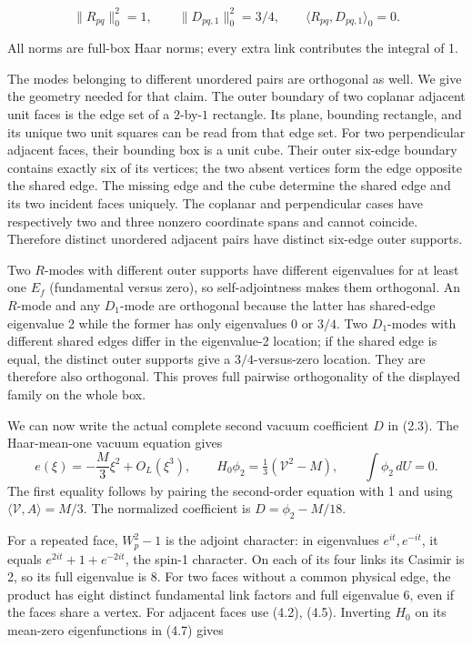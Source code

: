 \documentclass[
  11pt,
]{article}
\begin{document}
\[
\|R_{pq}\|_0^2=1,\qquad
\|D_{pq,1}\|_0^2=3/4,\qquad
\langle R_{pq},D_{pq,1}\rangle_0=0.
\tag{4.6}
\]

All norms are full-box Haar norms; every extra link contributes the
integral of 1.

The modes belonging to different unordered pairs are orthogonal as well.
We give the geometry needed for that claim. The outer boundary of two
coplanar adjacent unit faces is the edge set of a \(2\)-by-\(1\)
rectangle. Its plane, bounding rectangle, and its unique two unit
squares can be read from that edge set. For two perpendicular adjacent
faces, their bounding box is a unit cube. Their outer six-edge boundary
contains exactly six of its vertices; the two absent vertices form the
edge opposite the shared edge. The missing edge and the cube determine
the shared edge and its two incident faces uniquely. The coplanar and
perpendicular cases have respectively two and three nonzero coordinate
spans and cannot coincide. Therefore distinct unordered adjacent pairs
have distinct six-edge outer supports.

Two \(R\)-modes with different outer supports have different eigenvalues
for at least one \(E_f\) (fundamental versus zero), so self-adjointness
makes them orthogonal. An \(R\)-mode and any \(D_1\)-mode are orthogonal
because the latter has shared-edge eigenvalue 2 while the former has
only eigenvalues 0 or \(3/4\). Two \(D_1\)-modes with different shared
edges differ in the eigenvalue-2 location; if the shared edge is equal,
the distinct outer supports give a \(3/4\)-versus-zero location. They
are therefore also orthogonal. This proves full pairwise orthogonality
of the displayed family on the whole box.

We can now write the actual complete second vacuum coefficient \(D\) in
(2.3). The Haar-mean-one vacuum equation gives \[
e(\xi)=-\frac M3\xi^2+O_L(\xi^3),\qquad
H_0\phi_2=\tfrac13(\mathcal V^2-M),\qquad \int\phi_2\,dU=0.
\tag{4.7}
\] The first equality follows by pairing the second-order equation with
1 and using \(\langle\mathcal V,A\rangle=M/3\). The normalized
coefficient is \(D=\phi_2-M/18\).

For a repeated face, \(W_p^2-1\) is the adjoint character: in
eigenvalues \(e^{it},e^{-it}\), it equals \(e^{2it}+1+e^{-2it}\), the
spin-1 character. On each of its four links its Casimir is 2, so its
full eigenvalue is 8. For two faces without a common physical edge, the
product has eight distinct fundamental link factors and full eigenvalue
6, even if the faces share a vertex. For adjacent faces use (4.2),
(4.5). Inverting \(H_0\) on its mean-zero eigenfunctions in (4.7) gives
\end{document}
